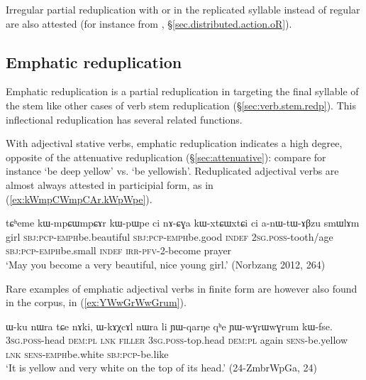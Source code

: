 Irregular partial reduplication with  or  in the replicated syllable instead of regular   are also attested (for instance  from  , §\ref{sec.distributed.action.oR}).
 
\subsection{Emphatic reduplication} \label{sec:emph.redp}
Emphatic reduplication is a partial reduplication in  targeting the final syllable of the stem like other cases of verb stem reduplication (§\ref{sec:verb.stem.redp}). This inflectional reduplication has several related functions.

With adjectival stative verbs,  emphatic reduplication indicates a high degree, opposite of the attenuative reduplication (§\ref{sec:attenuative}): compare for instance  `be deep yellow' vs.  `be yellowish'. Reduplicated adjectival verbs are almost always attested in participial form, as in (\ref{ex:kWmpCWmpCAr.kWpWpe}). 


\begin{exe}
\ex \label{ex:kWmpCWmpCAr.kWpWpe}
\gll tɕʰeme kɯ-mpɕɯ\redp{}mpɕɤr kɯ-pɯ\redp{}pe ci nɤ-ɕɣa  kɯ-xtɕɯ\redp{}xtɕi ci a-nɯ-tɯ-ɤβzu smɯlɤm \\
girl \textsc{sbj}:\textsc{pcp}-\textsc{emph}\redp{}be.beautiful \textsc{sbj}:\textsc{pcp}-\textsc{emph}\redp{}be.good \textsc{indef} \textsc{2sg}.\textsc{poss}-tooth/age  \textsc{sbj}:\textsc{pcp}-\textsc{emph}\redp{}be.small \textsc{indef} \textsc{irr}-\textsc{pfv}-2-become prayer \\
\glt `May you become a very beautiful, nice young girl.' (Norbzang 2012, 264)
\end{exe}

Rare examples of emphatic adjectival verbs in finite form are however also found in the corpus, in (\ref{ex:YWwGrWwGrum}).

\begin{exe}
\ex \label{ex:YWwGrWwGrum}
\gll ɯ-ku nɯra tɕe nɤki, ɯ-kɤχcɤl nɯra li ɲɯ-qarŋe qʰe ɲɯ-wɣrɯ\redp{}wɣrum kɯ-fse. \\
\textsc{3sg}.\textsc{poss}-head \textsc{dem}:\textsc{pl} \textsc{lnk} \textsc{filler} \textsc{3sg}.\textsc{poss}-top.head  \textsc{dem}:\textsc{pl} again \textsc{sens}-be.yellow \textsc{lnk} \textsc{sens}-\textsc{emph}\redp{}be.white \textsc{sbj}:\textsc{pcp}-be.like \\
\glt `It is yellow and very white on the top of its head.' (24-ZmbrWpGa, 24)
\end{exe}

